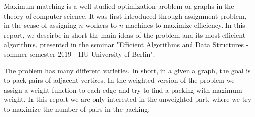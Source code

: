 Maximum matching is a well studied optimization problem on graphs in the theory of computer science. It was first introduced through assignment problem, in the sense of assigning $n$ workers to $n$ machines to maximize efficiency. In this report, we descirbe in short the main ideas of the problem and its most efficient algorithms, presented in the seminar "Efficient Algorithms and Data Structures - sommer semester 2019 - HU University of Berlin".

The problem has many different varieties. In short, in a given a graph, the goal is to pack pairs of adjacent vertices. In the weighted version of the problem we assign a weight function to each edge and try to find a packing with maximum weight. In this report we are only interested in the unweighted part, where we try to maximize the number of pairs in the packing.
